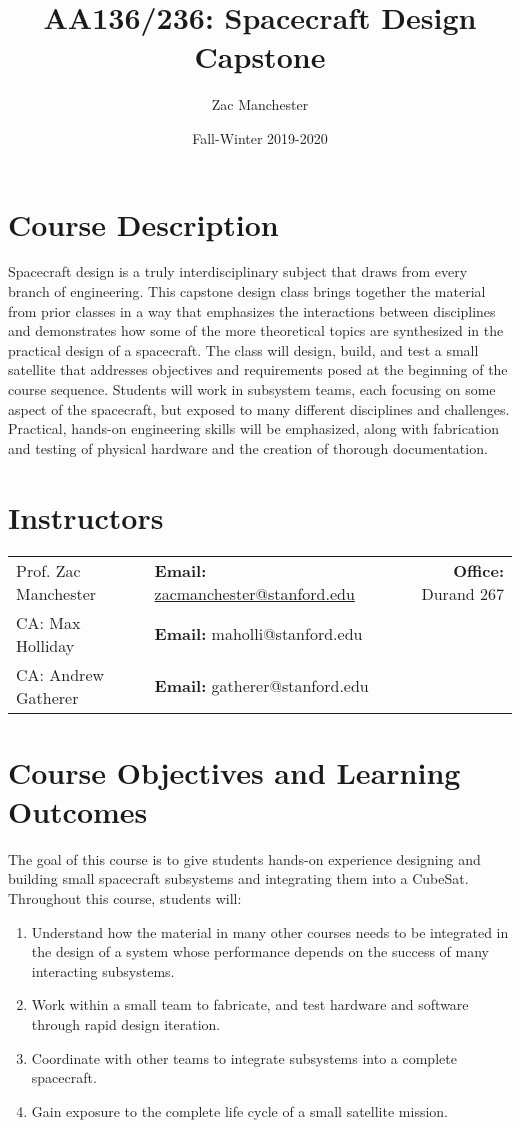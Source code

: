\documentclass[11pt,letterpaper]{article}
\title{AA136/236: Spacecraft Design Capstone}
\author{Zac Manchester}
\date{Fall-Winter 2019-2020}
\begin{document}
\maketitle

\section*{Course Description}

Spacecraft design is a truly interdisciplinary subject that draws from every branch of engineering. This capstone design class brings together the material from prior classes in a way that emphasizes the interactions between disciplines and demonstrates how some of the more theoretical topics are synthesized in the practical design of a spacecraft. The class will design, build, and test a small satellite that addresses objectives and requirements posed at the beginning of the course sequence. Students will work in subsystem teams, each focusing on some aspect of the spacecraft, but exposed to many different disciplines and challenges. Practical, hands-on engineering skills will be emphasized, along with fabrication and testing of physical hardware and the creation of thorough documentation.

\section*{Instructors}

\begin{center}
\begin{tabular}{l l r}
	Prof. Zac Manchester & \textbf{Email:} \href{mailto:zacmanchester@stanford.edu}{zacmanchester@stanford.edu} & \textbf{Office:} Durand 267 \\
	CA: Max Holliday & \textbf{Email:} maholli@stanford.edu \\
	CA: Andrew Gatherer & \textbf{Email:} gatherer@stanford.edu
\end{tabular}
\end{center}

\section*{Course Objectives and Learning Outcomes}

The goal of this course is to give students hands-on experience designing and building small spacecraft subsystems and integrating them into a CubeSat. Throughout this course, students will:
\begin{enumerate}
	\item Understand how the material in many other courses needs to be integrated in the design of a system whose performance depends on the success of many interacting subsystems.
	\item Work within a small team to fabricate, and test hardware and software through rapid design iteration.
	\item Coordinate with other teams to integrate subsystems into a complete spacecraft.
	\item Gain exposure to the complete life cycle of a small satellite mission.
\end{enumerate}
\end{document}

